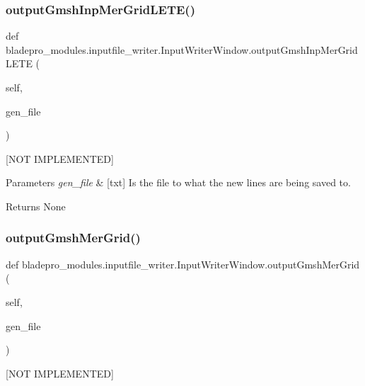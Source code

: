 \subsubsection{\texorpdfstring{output\+Gmsh\+Inp\+Mer\+Grid\+L\+E\+T\+E()}{outputGmshInpMerGridLETE()}}
{\footnotesize\ttfamily def bladepro\+\_\+modules.\+inputfile\+\_\+writer.\+Input\+Writer\+Window.\+output\+Gmsh\+Inp\+Mer\+Grid\+L\+E\+TE (\begin{DoxyParamCaption}\item[{}]{self,  }\item[{}]{gen\+\_\+file }\end{DoxyParamCaption})}



\mbox{[}N\+OT I\+M\+P\+L\+E\+M\+E\+N\+T\+ED\mbox{]} 


\begin{DoxyParams}{Parameters}
{\em gen\+\_\+file} & \mbox{[}txt\mbox{]} Is the file to what the new lines are being saved to. \\
\hline
\end{DoxyParams}
\begin{DoxyReturn}{Returns}
None 
\end{DoxyReturn}
\hypertarget{a00070_a0044216044b48baae08e478a2f358c39}{}\label{a00070_a0044216044b48baae08e478a2f358c39} 
\subsubsection{\texorpdfstring{output\+Gmsh\+Mer\+Grid()}{outputGmshMerGrid()}}
{\footnotesize\ttfamily def bladepro\+\_\+modules.\+inputfile\+\_\+writer.\+Input\+Writer\+Window.\+output\+Gmsh\+Mer\+Grid (\begin{DoxyParamCaption}\item[{}]{self,  }\item[{}]{gen\+\_\+file }\end{DoxyParamCaption})}



\mbox{[}N\+OT I\+M\+P\+L\+E\+M\+E\+N\+T\+ED\mbox{]} 


